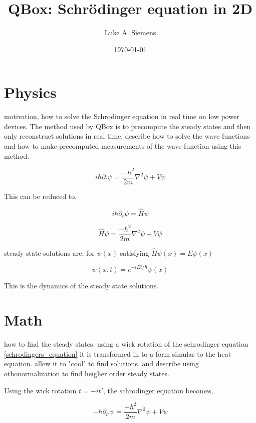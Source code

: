 \documentclass[%
 preprint,
 amsmath, amssymb, aps, pra, 10pt
]{revtex4-2}
\begin{document}
\title{QBox: Schrödinger equation in 2D}%

\author{Luke A. Siemens}
\noaffiliation

\date{\today}

\maketitle


\section{Physics}
motivation, how to solve the Schrodinger equation in real time on low power devices. The method used by QBox is to precompute the steady states and then only reconstruct solutions in real time.
describe how to solve the wave functions and how to make precomputed measurements of the wave function using this method.

\begin{equation}
i\hbar\partial_{t}\psi = \frac{-\hbar^2}{2m}\nabla^{2}\psi + V\psi
\label{schrodingers_equation}
\end{equation}

This can be reduced to,

\[
i\hbar\partial_{t}\psi = \hat{H}\psi
\]

\[
\hat{H}\psi = \frac{-\hbar^2}{2m}\nabla^{2}\psi + V\psi
\]

steady state solutions are, for $\psi(x)$ satisfying $\hat{H}\psi(x) = E\psi(x)$

\[
\psi(x, t) = e^{-iEt / \hbar}\psi(x)
\]

This is the dynamics of the steady state solutions.

\section{Math}
how to find the steady states. using a wick rotation of the schrodinger equation \eqref{schrodingers_equation} it is transformed in to a form simular to the heat equation. allow it to "cool" to find solutions.
and describe using othonormalization to find heigher order steady states.


Using the wick rotation $t = -it'$, the schrodinger equation becomes,

\begin{equation}
-\hbar\partial_{t'}\psi = \frac{-\hbar^2}{2m}\nabla^{2}\psi + V\psi
\label{wick_rotated_schrodinger}
\end{equation}
\end{document}
